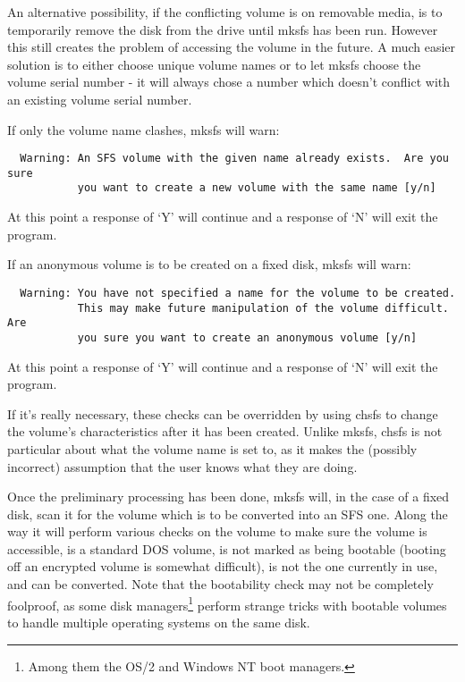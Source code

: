 An alternative possibility, if the conflicting volume is on removable media, is
to temporarily remove the disk from the drive until mksfs has been run.
However this still creates the problem of accessing the volume in the future.
A much easier solution is to either choose unique volume names or to let mksfs
choose the volume serial number - it will always chose a number which doesn't
conflict with an existing volume serial number.

If only the volume name clashes, mksfs will warn:
{\small

\begin{verbatim}
  Warning: An SFS volume with the given name already exists.  Are you sure
           you want to create a new volume with the same name [y/n]
\end{verbatim}

}
At this point a response of `Y' will continue and a response of `N' will exit
the program.

If an anonymous volume is to be created on a fixed disk, mksfs will warn:
{\small

\begin{verbatim}
  Warning: You have not specified a name for the volume to be created.
           This may make future manipulation of the volume difficult.  Are
           you sure you want to create an anonymous volume [y/n]
\end{verbatim}

}
At this point a response of `Y' will continue and a response of `N' will exit
the program.

If it's really necessary, these checks can be overridden by using chsfs to
change the volume's characteristics after it has been created.  Unlike mksfs,
chsfs is not particular about what the volume name is set to, as it makes the 
(possibly incorrect) assumption that the user knows what they are doing.

Once the preliminary processing has been done, mksfs will, in the case of a
fixed disk, scan it for the volume which is to be converted into an SFS one.
Along the way it will perform various checks on the volume to make sure the
volume is accessible, is a standard DOS volume, is not marked as being bootable
(booting off an encrypted volume is somewhat difficult), is not the one
currently in use, and can be converted.  Note that the bootability check may
not be completely foolproof, as some disk managers\footnote{
		Among them the OS/2 and Windows NT boot managers.
} perform strange tricks with
bootable volumes to handle multiple operating systems on the same disk.

